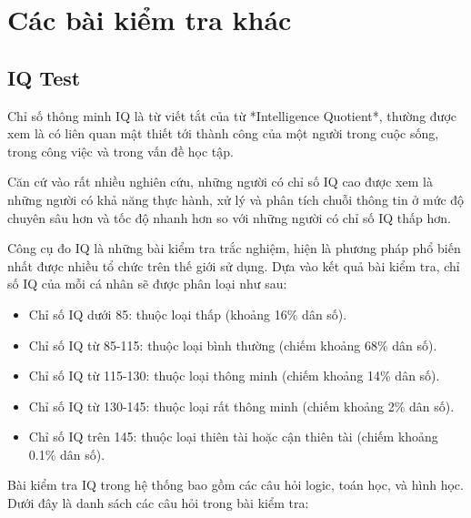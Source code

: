 \section{Các bài kiểm tra khác}

\subsection{IQ Test}
Chỉ số thông minh IQ là từ viết tắt của từ *Intelligence Quotient*, thường được xem là có liên quan mật thiết tới thành công của một người trong cuộc sống, trong công việc và trong vấn đề học tập. 

Căn cứ vào rất nhiều nghiên cứu, những người có chỉ số IQ cao được xem là những người có khả năng thực hành, xử lý và phân tích chuỗi thông tin ở mức độ chuyên sâu hơn và tốc độ nhanh hơn so với những người có chỉ số IQ thấp hơn. 

Công cụ đo IQ là những bài kiểm tra trắc nghiệm, hiện là phương pháp phổ biến nhất được nhiều tổ chức trên thế giới sử dụng. Dựa vào kết quả bài kiểm tra, chỉ số IQ của mỗi cá nhân sẽ được phân loại như sau:
\begin{itemize}
    \item Chỉ số IQ dưới 85: thuộc loại thấp (khoảng 16\% dân số).
    \item Chỉ số IQ từ 85-115: thuộc loại bình thường (chiếm khoảng 68\% dân số).
    \item Chỉ số IQ từ 115-130: thuộc loại thông minh (chiếm khoảng 14\% dân số).
    \item Chỉ số IQ từ 130-145: thuộc loại rất thông minh (chiếm khoảng 2\% dân số).
    \item Chỉ số IQ trên 145: thuộc loại thiên tài hoặc cận thiên tài (chiếm khoảng 0.1\% dân số).
\end{itemize}

Bài kiểm tra IQ trong hệ thống bao gồm các câu hỏi logic, toán học, và hình học. Dưới đây là danh sách các câu hỏi trong bài kiểm tra:


